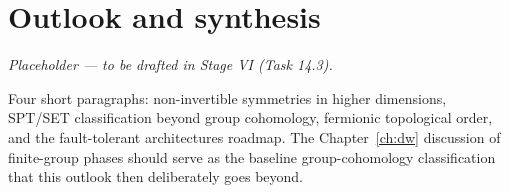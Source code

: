 \chapter{Outlook and synthesis}\label{ch:outlook}

\emph{Placeholder --- to be drafted in Stage VI (Task 14.3).}

Four short paragraphs: non-invertible symmetries in higher dimensions, SPT/SET classification beyond group cohomology, fermionic topological order, and the fault-tolerant architectures roadmap. The Chapter~\ref{ch:dw} discussion of finite-group phases should serve as the baseline group-cohomology classification that this outlook then deliberately goes beyond.
